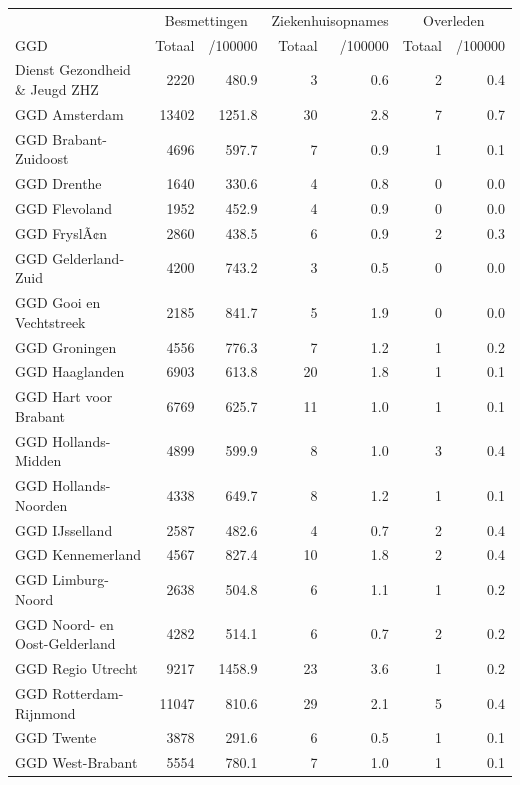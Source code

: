 \documentclass[
  english,
  man,floatsintext]{apa6}
\begin{document}
\begin{table}
\centering\begingroup\fontsize{10}{12}\selectfont

\begin{threeparttable}
\begin{tabular}{lrrrrrr}
\toprule
\multicolumn{1}{c}{ } & \multicolumn{2}{c}{Besmettingen} & \multicolumn{2}{c}{Ziekenhuisopnames} & \multicolumn{2}{c}{Overleden} \\
\cmidrule(l{3pt}r{3pt}){2-3} \cmidrule(l{3pt}r{3pt}){4-5} \cmidrule(l{3pt}r{3pt}){6-7}
GGD & Totaal & /100000 & Totaal & /100000 & Totaal & /100000\\
\midrule
Dienst Gezondheid \& Jeugd ZHZ & 2220 & 480.9 & 3 & 0.6 & 2 & 0.4\\
GGD Amsterdam & 13402 & 1251.8 & 30 & 2.8 & 7 & 0.7\\
GGD Brabant-Zuidoost & 4696 & 597.7 & 7 & 0.9 & 1 & 0.1\\
GGD Drenthe & 1640 & 330.6 & 4 & 0.8 & 0 & 0.0\\
GGD Flevoland & 1952 & 452.9 & 4 & 0.9 & 0 & 0.0\\
GGD FryslÃ¢n & 2860 & 438.5 & 6 & 0.9 & 2 & 0.3\\
GGD Gelderland-Zuid & 4200 & 743.2 & 3 & 0.5 & 0 & 0.0\\
GGD Gooi en Vechtstreek & 2185 & 841.7 & 5 & 1.9 & 0 & 0.0\\
GGD Groningen & 4556 & 776.3 & 7 & 1.2 & 1 & 0.2\\
GGD Haaglanden & 6903 & 613.8 & 20 & 1.8 & 1 & 0.1\\
GGD Hart voor Brabant & 6769 & 625.7 & 11 & 1.0 & 1 & 0.1\\
GGD Hollands-Midden & 4899 & 599.9 & 8 & 1.0 & 3 & 0.4\\
GGD Hollands-Noorden & 4338 & 649.7 & 8 & 1.2 & 1 & 0.1\\
GGD IJsselland & 2587 & 482.6 & 4 & 0.7 & 2 & 0.4\\
GGD Kennemerland & 4567 & 827.4 & 10 & 1.8 & 2 & 0.4\\
GGD Limburg-Noord & 2638 & 504.8 & 6 & 1.1 & 1 & 0.2\\
GGD Noord- en Oost-Gelderland & 4282 & 514.1 & 6 & 0.7 & 2 & 0.2\\
GGD Regio Utrecht & 9217 & 1458.9 & 23 & 3.6 & 1 & 0.2\\
GGD Rotterdam-Rijnmond & 11047 & 810.6 & 29 & 2.1 & 5 & 0.4\\
GGD Twente & 3878 & 291.6 & 6 & 0.5 & 1 & 0.1\\
GGD West-Brabant & 5554 & 780.1 & 7 & 1.0 & 1 & 0.1\\

\end{tabular}
\end{threeparttable}
\end{table}
\end{document}
